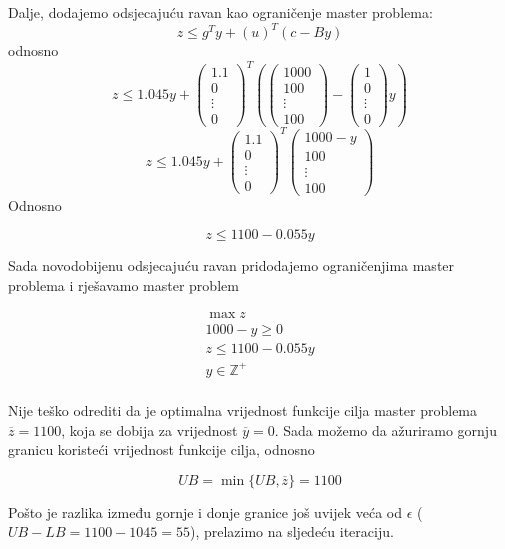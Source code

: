 \documentclass[a4paper, utf8, 11pt, colorlinks]{book}
\begin{document}
Dalje, dodajemo odsjecajuću ravan kao ograničenje master problema:
$$z\leqslant g^Ty+(u)^T(c-By)$$ 
odnosno
$$z\leqslant 1.045y+\left(\begin{array}{c}
	1.1 \\
	0 \\
	\vdots \\
	0
\end{array}\right)^T
\left(\left(\begin{array}{c}
	1000 \\
	100 \\
	\vdots \\
	100
\end{array}\right)-\left(\begin{array}{c}
1 \\
0 \\
\vdots \\
0
\end{array}\right)y\right)$$
$$z\leqslant 1.045y+\left(\begin{array}{c}
	1.1 \\
	0 \\
	\vdots \\
	0
\end{array}\right)^T
\left(\begin{array}{c}
	1000-y \\
	100 \\
	\vdots \\
	100
\end{array}\right)$$
Odnosno

$$z\leqslant 1100-0.055y$$

Sada novodobijenu odsjecajuću ravan pridodajemo ograničenjima master problema i rješavamo master problem

$$
\begin{aligned}
	\max z\\
	1000-y\geqslant 0\\
	z\leqslant 1100-0.055y\\ 
	y\in\mathbb{Z}^+\\	
\end{aligned}
$$

Nije teško odrediti da je optimalna vrijednost funkcije cilja master problema $\overline{z}=1100$, koja se dobija za vrijednost $\overline{y}=0$.
Sada možemo da ažuriramo gornju granicu koristeći vrijednost funkcije cilja, odnosno

$$UB = \min\{UB,\overline{z}\} = 1100$$

Pošto je razlika između gornje i donje granice još uvijek veća od $\epsilon$ ($UB-LB = 1100-1045=55$), prelazimo na sljedeću iteraciju.
\end{document}
